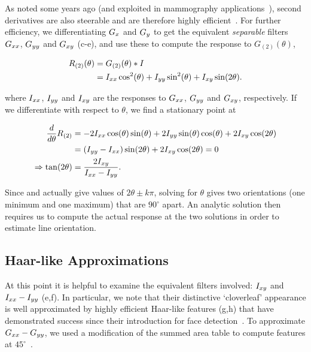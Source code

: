 As noted some years ago (and exploited in mammography applications~\cite{Karssemeijer_teBrake_TMI96}), second derivatives are also steerable and are therefore highly efficient~\cite{Freeman_Adelson_TPAMI91,Koenderink_vanDoorn_TPAMI92}. For further efficiency, we differentiating $G_x$ and $G_y$ to get the equivalent \emph{separable} filters $G_{xx}$, $G_{yy}$ and $G_{xy}$ (c-e), and use these to compute the response to $G_{(2)}(\theta)$,

\begin{align}
R_{(2)}(\theta)
	&= 	G_{(2)}(\theta) \ast I \\
	&=	I_{xx}\cos^2(\theta) + I_{yy}\sin^2(\theta) + I_{xy}\sin(2\theta).
\label{e:R2}
\end{align}

\noindent where $I_{xx}$, $I_{yy}$ and $I_{xy}$ are the responses to $G_{xx}$, $G_{yy}$ and $G_{xy}$, respectively. If we differentiate with respect to $\theta$, we find a stationary point at

\begin{align}
\frac{d}{d\theta}R_{(2)}
	&= 	-2I_{xx}\cos(\theta)\sin(\theta) + 2I_{yy}\sin(\theta)\cos(\theta) + 2I_{xy}\cos(2\theta) \\
	&= 	(I_{yy}-I_{xx})\sin(2\theta) + 2I_{xy}\cos(2\theta) = 0 \\
\Rightarrow \tan(2\theta)
	&= 	\frac{2I_{xy}}{I_{xx}-I_{yy}}.
\label{e:t2}
\end{align}

Since  and  actually give values of $2\theta \pm k\pi$, solving for $\theta$ gives two orientations (one minimum and one maximum) that are $90^\circ$ apart. An analytic solution then requires us to compute the actual response at the two solutions in order to estimate line orientation. 


\subsection{Haar-like Approximations}
At this point it is helpful to examine the equivalent filters involved: $I_{xy}$ and $I_{xx}-I_{yy}$ (e,f). In particular, we note that their distinctive `cloverleaf' appearance is well approximated by highly efficient Haar-like features (g,h) that have demonstrated success since their introduction for face detection~\cite{Viola_Jones_IJCV04}. To approximate $G_{xx}-G_{yy}$, we used a modification of the summed area table to compute features at $45^\circ$~\cite{Lienhart_Maydt_ICIP02}.

